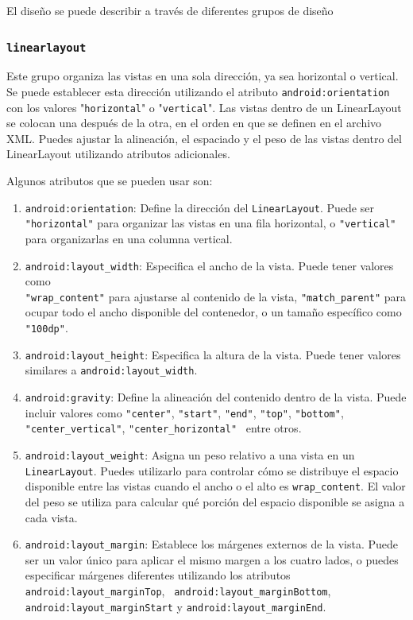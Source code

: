 El diseño se puede describir a través de diferentes grupos de diseño

\subsubsection{\texttt{linearlayout}} Este grupo organiza las vistas en una sola dirección, ya sea horizontal o vertical. Se puede establecer esta dirección utilizando el atributo \texttt{android:orientation} con los valores "\texttt{horizontal}" o "\texttt{vertical}". Las vistas dentro de un LinearLayout se colocan una después de la otra, en el orden en que se definen en el archivo XML. Puedes ajustar la alineación, el espaciado y el peso de las vistas dentro del LinearLayout utilizando atributos adicionales.

Algunos atributos que se pueden usar son:

\begin{enumerate}
\item \texttt{android:orientation}: Define la dirección del \texttt{LinearLayout}. Puede ser \texttt{"horizontal"} para organizar las vistas en una fila horizontal, o \texttt{"vertical"} para organizarlas en una columna vertical.

\item \texttt{android:layout\_width}: Especifica el ancho de la vista. Puede tener valores como \\ \texttt{"wrap\_content"} para ajustarse al contenido de la vista, \texttt{"match\_parent"} para ocupar todo el ancho disponible del contenedor, o un tamaño específico como \texttt{"100dp"}.

\item \texttt{android:layout\_height}: Especifica la altura de la vista. Puede tener valores similares a \texttt{android:layout\_width}.

\item \texttt{android:gravity}: Define la alineación del contenido dentro de la vista. Puede incluir valores como \texttt{"center"}, \texttt{"start"}, \texttt{"end"}, \texttt{"top"}, \texttt{"bottom"}, \texttt{"center\_vertical"}, \texttt{"center\_horizontal"} \ entre otros.

\item \texttt{android:layout\_weight}: Asigna un peso relativo a una vista en un \texttt{LinearLayout}. Puedes utilizarlo para controlar cómo se distribuye el espacio disponible entre las vistas cuando el ancho o el alto es \texttt{wrap\_content}. El valor del peso se utiliza para calcular qué porción del espacio disponible se asigna a cada vista.

\item \texttt{android:layout\_margin}: Establece los márgenes externos de la vista. Puede ser un valor único para aplicar el mismo margen a los cuatro lados, o puedes especificar márgenes diferentes utilizando los atributos \texttt{android:layout\_marginTop}, \ \texttt{android:layout\_marginBottom}, \texttt{android:layout\_marginStart} y \texttt{android:layout\_marginEnd}.
\end{enumerate}


